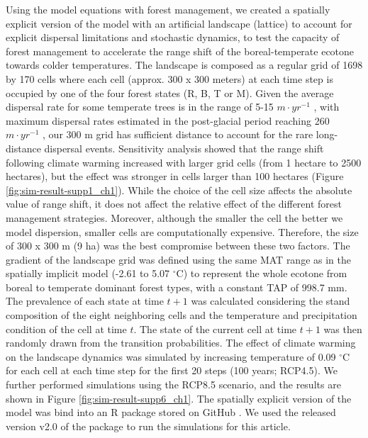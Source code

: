 Using the model equations with forest management, we created a spatially
explicit version of the model with an artificial landscape (lattice) to
account for explicit dispersal limitations and stochastic dynamics, to
test the capacity of forest management to accelerate the range shift of
the boreal-temperate ecotone towards colder temperatures. The landscape
is composed as a regular grid of 1698 by 170 cells where each cell
(approx. 300 x 300 meters) at each time step is occupied by one of the
four forest states (R, B, T or M). Given the average dispersal rate for
some temperate trees is in the range of 5-15 \(m \cdot yr^{-1}\)
\citep{Ribbens1994}, with maximum dispersal rates estimated in the
post-glacial period reaching 260 \(m \cdot yr^{-1}\)
\citep{Feurdean2013}, our 300 m grid has sufficient distance to account
for the rare long-distance dispersal events. Sensitivity analysis showed
that the range shift following climate warming increased with larger
grid cells (from 1 hectare to 2500 hectares), but the effect was
stronger in cells larger than 100 hectares (Figure \ref{fig:sim-result-supp1_ch1}). While the choice
of the cell size affects the absolute value of range shift, it does not
affect the relative effect of the different forest management
strategies. Moreover, although the smaller the cell the better we model
dispersion, smaller cells are computationally expensive. Therefore, the
size of 300 x 300 m (9 ha) was the best compromise between these two
factors. The gradient of the landscape grid was defined using the same
MAT range as in the spatially implicit model (-2.61 to 5.07
\(^{\circ}\)C) to represent the whole ecotone from boreal to temperate
dominant forest types, with a constant TAP of 998.7 mm. The prevalence
of each state at time \(t + 1\) was calculated considering the stand
composition of the eight neighboring cells and the temperature and
precipitation condition of the cell at time \(t\). The state of the
current cell at time \(t + 1\) was then randomly drawn from the
transition probabilities. The effect of climate warming on the landscape
dynamics was simulated by increasing temperature of 0.09 \(^{\circ}\)C
for each cell at each time step for the first 20 steps (100 years;
RCP4.5). We further performed simulations using the RCP8.5 scenario, and
the results are shown in Figure \ref{fig:sim-result-supp6_ch1}. The spatially explicit version of
the model was bind into an R package stored on GitHub
\citep{STManaged2020}. We used the released version v2.0 of the package
to run the simulations for this article.\\

